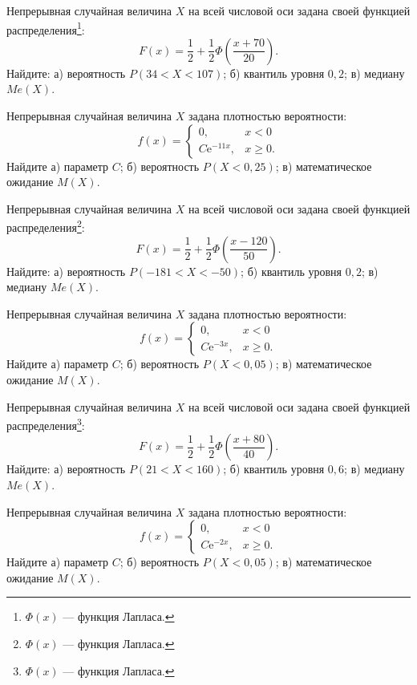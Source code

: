 \vfill

\newpage\setcounter{zad}{0}

\z Непрерывная случайная величина $X$ на всей числовой оси задана своей функцией распределения\footnote{$\Phi(x)$ --- функция Лапласа.}: $$ F(x) = \frac{1}{2} + \frac{1}{2}\Phi\left( \frac{x + 70}{20} \right). $$ Найдите: а) вероятность $P(34 < X < 107)$; б) квантиль уровня $0{,}2$; в) медиану $Me(X)$.


\vfill

\z Непрерывная случайная величина $X$ задана плотностью вероятности: $$ f(x) = \begin{cases}0, & x < 0 \\ C\mathrm{e}^{-11x}, & x \geqslant 0.\end{cases} $$ Найдите а) параметр $C$; б) вероятность $P(X < 0{,}25)$; в) математическое ожидание $M(X)$.
 

\vfill

\newpage\setcounter{zad}{0}

\z Непрерывная случайная величина $X$ на всей числовой оси задана своей функцией распределения\footnote{$\Phi(x)$ --- функция Лапласа.}: $$ F(x) = \frac{1}{2} + \frac{1}{2}\Phi\left( \frac{x - 120}{50} \right). $$ Найдите: а) вероятность $P(-181 < X < -50)$; б) квантиль уровня $0{,}2$; в) медиану $Me(X)$.


\vfill

\z Непрерывная случайная величина $X$ задана плотностью вероятности: $$ f(x) = \begin{cases}0, & x < 0 \\ C\mathrm{e}^{-3x}, & x \geqslant 0.\end{cases} $$ Найдите а) параметр $C$; б) вероятность $P(X < 0{,}05)$; в) математическое ожидание $M(X)$.
 

\vfill

\newpage\setcounter{zad}{0}

\z Непрерывная случайная величина $X$ на всей числовой оси задана своей функцией распределения\footnote{$\Phi(x)$ --- функция Лапласа.}: $$ F(x) = \frac{1}{2} + \frac{1}{2}\Phi\left( \frac{x + 80}{40} \right). $$ Найдите: а) вероятность $P(21 < X < 160)$; б) квантиль уровня $0{,}6$; в) медиану $Me(X)$.


\vfill

\z Непрерывная случайная величина $X$ задана плотностью вероятности: $$ f(x) = \begin{cases}0, & x < 0 \\ C\mathrm{e}^{-2x}, & x \geqslant 0.\end{cases} $$ Найдите а) параметр $C$; б) вероятность $P(X < 0{,}05)$; в) математическое ожидание $M(X)$.
 

